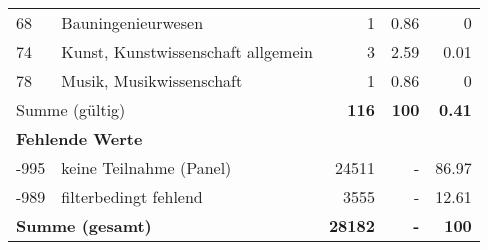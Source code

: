 \begin{longtable}{lXrrr}
        68 & \multicolumn{1}{X}{Bauningenieurwesen} & %
          \num{1} &
          \num[round-mode=places,round-precision=2]{0,86} &
          \num[round-mode=places,round-precision=2]{0} \\

        74 & \multicolumn{1}{X}{Kunst, Kunstwissenschaft allgemein} & %
          \num{3} &
          \num[round-mode=places,round-precision=2]{2,59} &
          \num[round-mode=places,round-precision=2]{0,01} \\

        78 & \multicolumn{1}{X}{Musik, Musikwissenschaft} & %
          \num{1} &
          \num[round-mode=places,round-precision=2]{0,86} &
          \num[round-mode=places,round-precision=2]{0} \\

     \midrule
     \multicolumn{2}{l}{Summe (gültig)} &
       \textbf{\num{116}} &
     \textbf{100} &
       \textbf{\num[round-mode=places,round-precision=2]{0,41}} \\
     \multicolumn{5}{l}{\textbf{Fehlende Werte}}\\
       -995 &
       keine Teilnahme (Panel) &
         \num{24511} &
        - &
         \num[round-mode=places,round-precision=2]{86,97} \\
       -989 &
       filterbedingt fehlend &
         \num{3555} &
        - &
         \num[round-mode=places,round-precision=2]{12,61} \\
     \midrule
     \multicolumn{2}{l}{\textbf{Summe (gesamt)}} &
          \textbf{\num{28182}} &
        \textbf{-} &
        \textbf{100} \\
     \bottomrule
     \end{longtable}
     
